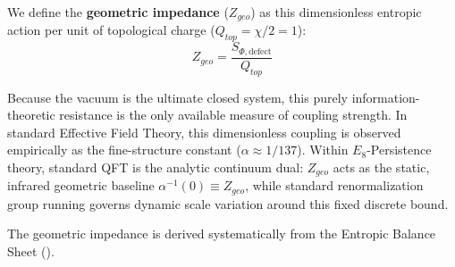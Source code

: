 We define the \textbf{geometric impedance} ($Z_{geo}$) as this dimensionless entropic action per unit of topological charge ($Q_{top} = \chi/2 = 1$):
\begin{equation}
    Z_{geo} = \frac{S_{\Phi,\text{defect}}}{Q_{top}}
\end{equation}

Because the vacuum is the ultimate closed system, this purely information-theoretic resistance is the only available measure of coupling strength. In standard Effective Field Theory, this dimensionless coupling is observed empirically as the fine-structure constant ($\alpha \approx 1/137$). Within $E_8$-Persistence theory, standard QFT is the analytic continuum dual: $Z_{geo}$ acts as the static, infrared geometric baseline $\alpha^{-1}(0) \equiv Z_{geo}$, while standard renormalization group running governs dynamic scale variation around this fixed discrete bound.

The geometric impedance is derived systematically from the Entropic Balance Sheet ().

